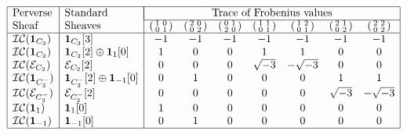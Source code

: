 \documentclass[10pt]{amsart}
\theoremstyle{plain}
\theoremstyle{definition}
\newcommand{\cs}[1]{{\mathcal{#1}}}
\newcommand{\IC}{\mathcal{IC}}
\begin{document}
\begin{spacing}{1.3}
\[
\begin{array}{|l|l|ccccccc|}
\hline
\text{Perverse} & \text{Standard} & \multicolumn{7}{|c|}{\text{Trace of Frobenius values}} \\ \cline{3-9}
\text{Sheaf} & \text{Sheaves} & (\begin{smallmatrix}1 & 0\\ 0 & 1\end{smallmatrix}) & (\begin{smallmatrix}2 & 0\\ 0 & 2\end{smallmatrix}) & (\begin{smallmatrix}0 & 1\\ 2 & 0\end{smallmatrix})  & (\begin{smallmatrix}1 & 1\\ 0 & 1\end{smallmatrix})  & (\begin{smallmatrix}1 & 2\\ 0 & 1\end{smallmatrix}) & (\begin{smallmatrix}2 & 1\\ 0 & 2\end{smallmatrix})  & (\begin{smallmatrix}2 & 2\\ 0 & 2\end{smallmatrix}) \\
\hline
\IC(\mathbf{1}_{C_3})  &  \mathbf{1}_{C_3}[3]  & -1 & -1 & -1 & -1 & -1 & -1 & -1 \\
 \IC(\mathbf{1}_{C_2})  &  \mathbf{1}_{C_2}[2] \oplus \mathbf{1}_1[0]  & 1 & 0 & 0 & 1 & 1 & 0 & 0 \\
 \IC(\cs{E}_{C_2})  &  \cs{E}_{C_2}[2]  & 0 & 0 & 0 &  \sqrt{-3}  &  -\sqrt{-3} & 0 & 0 \\
 \IC(\mathbf{1}_{C_2^-})  &  \mathbf{1}_{C_2^-}[2] \oplus \mathbf{1}_{-1}[0]  & 0 & 1 & 0 & 0 & 0 & 1 & 1 \\
 \IC(\cs{E}_{C_2^-})  &  \cs{E}_{C_2^-}[2]  & 0 & 0 & 0 & 0 & 0 &   \sqrt{-3}  &   -\sqrt{-3}  \\
 \IC(\mathbf{1}_1)  &  \mathbf{1}_1[0]  & 1 & 0 & 0 & 0 & 0 & 0 & 0 \\
 \IC(\mathbf{1}_{-1})  &  \mathbf{1}_{-1}[0]  & 0 & 1 & 0 & 0 & 0 & 0 & 0 \\
\hline
\end{array}
\]
\end{spacing}
\end{document}
